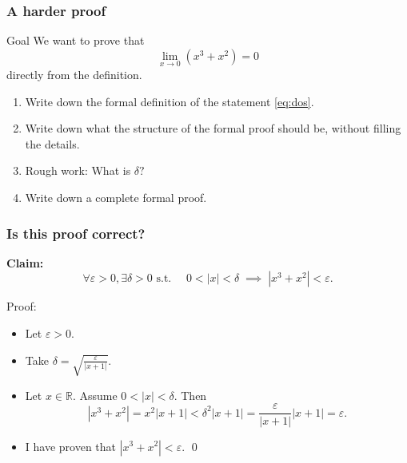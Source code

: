 \begin{frame}
	\frametitle{A harder proof}

	\begin{block}{Goal}
		We want to prove that
		\begin{equation}
			\label{eq:dos}\lim_{x \to 0}\left( x^{3}+ x^{2}\right) = 0
		\end{equation}
		directly from the definition.
	\end{block}
	\vfill
	\begin{enumerate}

		\item Write down the formal definition of the statement \eqref{eq:dos}.

		\item Write down what the structure of the formal proof should be, without
			filling the details.

		\item Rough work: What is $\delta?$

		\item Write down a complete formal proof.
	\end{enumerate}
	\vfill
\end{frame}

\begin{frame}[t]
	\frametitle{Is this proof correct?}

	{\bfseries Claim:}
	\[
		\forall \varepsilon >0, \exists \delta>0 \text{ s.t. }\quad 0<|x|<\delta \; \implies
		\; |x^{3}+x^{2}| < \varepsilon.
	\]
	\vfill
	\begin{block}{Proof:}
		\begin{itemize}
			\item Let $\varepsilon >0$.

			\item Take $\displaystyle \delta = \sqrt{\frac{\varepsilon}{|x+1|}}$.

			\item Let $x \in \mathbb{R}$. Assume $0 < |x| < \delta$. Then
				\[
					|x^{3}+x^{2}| = x^{2}| x + 1| < \delta^{2}|x+1| = \frac{\varepsilon}{|x+1|}
					|x+1| = \varepsilon.
				\]

			\item I have proven that $\displaystyle |x^{3}+x^{2}| < \varepsilon$.
				\hfill \qed
		\end{itemize}
	\end{block}

	\vfill
\end{frame}

